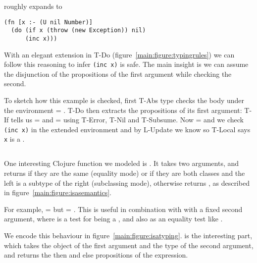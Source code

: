 roughly expands to

\begin{verbatim}
(fn [x :- (U nil Number)]
  (do (if x (throw (new Exception)) nil)
      (inc x)))
\end{verbatim}

With an elegant extension in T-Do (figure~\ref{main:figure:typingrules}) we can follow this reasoning
to infer \texttt{(inc x)} is safe. The main insight is we can assume the
disjunction of the propositions of the first \doliteral{} argument while checking the second.

To sketch how this example is checked, first T-Abs type checks the body under the 
environment \propenv{} = {\isprop{\Union{\Nil}{\Number{}}}{\x{}}}.
T-Do then extracts the propositions of its first argument:
T-If tells us  = {\orprop{\botprop{}}{\botprop{}}} and 
 = {\orprop{\botprop{}}{\notprop{\falsy{}}{\x{}}}}
using T-Error, T-Nil and T-Subsume.
Now { {}} = {\notprop{\falsy}{\x{}}}
and we check \texttt{(inc x)} in the extended environment 
\ma{{\propenv{},{\notprop{\falsy}{\x{}}}}}
and by L-Update we know {\isprop{\Number}{\x{}}}
so T-Local says \texttt{x} is a \Number.

\subsection{\isaliteral{}}

One interesting Clojure function we modeled is \isaliteral.
It takes two arguments, and returns \true{} if they are the same (equality mode)
or if they are both classes and the left is a subtype of the right (subclassing mode),
otherwise returns \false{}, as described in figure~\ref{main:figure:isasemantics}.

For example, {\isaapp{\Keyword}{\Object}} = \true{} but 
{\isaapp{\Object}{\Keyword}} = \false{}.
This is useful in combination with \classconst{}
with a fixed second argument, where {\isaapp{\appexp{\classconst}{\x{}}}{\Keyword}}
is a test for \x{} being a \Keyword{}, and also
as an equality test like
{}.

We encode this behaviour in figure~\ref{main:figure:isatyping}. 
\isacompareliteral{} is the interesting part,
which takes the object of the first argument 
and the type of the second argument, and returns the then and else propositions
of the expression.

